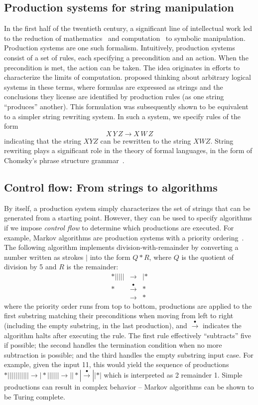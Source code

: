 \documentclass[10pt]{article} %
\begin{document}
\subsection{Production systems for string manipulation}
In the first half of the twentieth century, a significant line of intellectual work led to the reduction of mathematics~\citep{whitehead1997principia} and computation~\citep{church1932set, turing1936computable} to symbolic manipulation.
Production systems are one such formalism. Intuitively, production systems consist of a set of rules, each specifying a precondition and an action. When the precondition is met, the action can be taken. The idea originates in efforts to characterize the limits of computation. \cite{post1943formal} proposed thinking about arbitrary logical systems in these terms, where formulas are expressed as strings and the conclusions they license are identified by production rules (as one string ``produces'' another). This formulation was subsequently shown to be equivalent to a simpler string rewriting system. In such a system, we specify rules of the form
\[
X \, Y \, Z \rightarrow X \, W \, Z
\]
indicating that the string $XYZ$ can be rewritten to the string $XWZ$. String rewriting plays a significant role in the theory of formal languages, in the form of Chomsky's phrase structure grammar~\citep{chomsky1956three}.

\subsection{Control flow: From strings to algorithms}

By itself, a production system simply characterizes the set of strings that can be generated from a starting point. However, they can be used to specify algorithms if we impose \emph{control flow} to determine which productions are executed. For example, Markov algorithms are production systems with a priority ordering~\citep{markov1954theory}. The following algorithm implements division-with-remainder by converting a number written as strokes $|$ into the form $Q*R$, where $Q$ is the quotient of division by 5 and $R$ is the remainder:
\begin{eqnarray*}
  *||||| &\rightarrow& |* \\
  * &\xrightarrow{\bullet}& * \\
  & \rightarrow& * 
\end{eqnarray*}
where the priority order runs from top to bottom, productions are applied to the first substring matching their preconditions when moving from left to right (including the empty substring, in the last production), and $\xrightarrow{\bullet}$ indicates the algorithm halts after executing the rule. The first rule effectively ``subtracts'' five if possible; the second handles the termination condition when no more subtraction is possible; and the third handles the empty substring input case. For example, given the input 11, this would yield the sequence of productions $*||||||||||| \rightarrow |*|||||| \rightarrow ||*| \xrightarrow{\bullet} ||*|$ which is interpreted as 2 remainder 1. Simple productions can result in complex behavior -- Markov algorithms can be shown to be Turing complete. 
\end{document}
